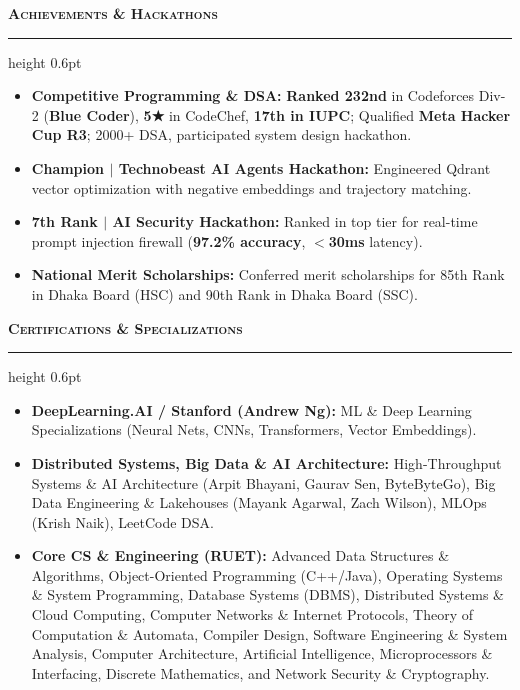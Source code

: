 \documentclass[10pt,a4paper]{article}
\newcommand{\resumesection}[1]{%
    \vspace{2.2pt}%
    {\color{burgundy}\scshape\bfseries\fontsize{9.0pt}{10.2pt}\selectfont #1}%
    \vspace{0.6pt}%
    \hrule height 0.6pt\relax%
    \vspace{1.6pt}%
}
\begin{document}
\begin{minipage}[t]{0.488\textwidth}
    \resumesection{Achievements \& Hackathons}
    \begin{itemize}
        \item \textbf{Competitive Programming \& DSA:} \textbf{Ranked 232nd} in Codeforces Div-2 (\textbf{Blue Coder}), \textbf{5★} in CodeChef, \textbf{17th in IUPC}; Qualified \textbf{Meta Hacker Cup R3}; 2000+ DSA, participated system design hackathon.
        \item \textbf{Champion $\vert$ Technobeast AI Agents Hackathon:} Engineered Qdrant vector optimization with negative embeddings and trajectory matching.
        \item \textbf{7th Rank $\vert$ AI Security Hackathon:} Ranked in top tier for real-time prompt injection firewall (\textbf{97.2\% accuracy}, \textbf{$<$30ms} latency).
        \item \textbf{National Merit Scholarships:} Conferred merit scholarships for 85th Rank in Dhaka Board (HSC) and 90th Rank in Dhaka Board (SSC).
    \end{itemize}

    \resumesection{Certifications \& Specializations}
    \begin{itemize}
        \item \textbf{DeepLearning.AI / Stanford (Andrew Ng):} ML \& Deep Learning Specializations (Neural Nets, CNNs, Transformers, Vector Embeddings).
        \item \textbf{Distributed Systems, Big Data \& AI Architecture:} High-Throughput Systems \& AI Architecture (Arpit Bhayani, Gaurav Sen, ByteByteGo), Big Data Engineering \& Lakehouses (Mayank Agarwal, Zach Wilson), MLOps (Krish Naik), LeetCode DSA.
        \item \textbf{Core CS \& Engineering (RUET):} Advanced Data Structures \& Algorithms, Object-Oriented Programming (C++/Java), Operating Systems \& System Programming, Database Systems (DBMS), Distributed Systems \& Cloud Computing, Computer Networks \& Internet Protocols, Theory of Computation \& Automata, Compiler Design, Software Engineering \& System Analysis, Computer Architecture, Artificial Intelligence, Microprocessors \& Interfacing, Discrete Mathematics, and Network Security \& Cryptography.
    \end{itemize}


\end{minipage}
\end{document}
